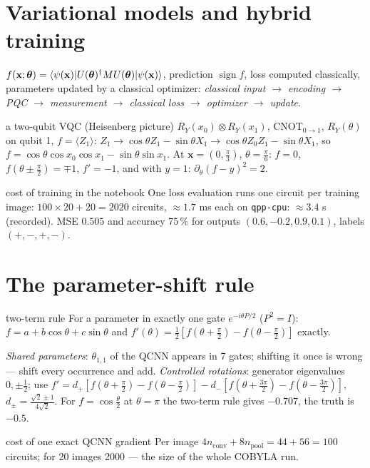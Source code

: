 \documentclass[11pt,a4paper,openany]{book}
\newcounter{wex}[chapter]
\newcommand{\bt}{\boldsymbol\theta}
\newcommand{\bx}{\mathbf x}
\begin{document}
\section{Variational models and hybrid training}
$f(\bx;\bt) = \braket{\psi(\bx)|U(\bt)^\dagger MU(\bt)|\psi(\bx)}$, prediction $\operatorname{sign}f$, loss computed classically, parameters
updated by a classical optimizer: \emph{classical input $\to$ encoding $\to$ PQC $\to$ measurement $\to$ classical loss $\to$ optimizer $\to$ update}.
\begin{wexample}{a two-qubit VQC (Heisenberg picture)}
$R_Y(x_0)\otimes R_Y(x_1)$, CNOT$_{0\to1}$, $R_Y(\theta)$ on qubit 1, $f = \langle Z_1\rangle$:
$Z_1 \to \cos\theta Z_1 - \sin\theta X_1 \to \cos\theta Z_0Z_1 - \sin\theta X_1$, so $f = \cos\theta\cos x_0\cos x_1 - \sin\theta\sin x_1$.
At $\bx = (0, \frac\pi3)$, $\theta = \frac\pi6$: $f = 0$, $f(\theta\pm\frac\pi2) = \mp1$, $f' = -1$, and with $y = 1$: $\partial_\theta(f - y)^2 = 2$.
\end{wexample}
\begin{keyres}{cost of training in the notebook}
One loss evaluation runs one circuit per training image: $100\times20 + 20 = 2020$ circuits, $\approx1.7$ ms each on \texttt{qpp-cpu}:
$\approx3.4$ s (recorded). MSE $0.505$ and accuracy $75\,\%$ for outputs $(0.6, -0.2, 0.9, 0.1)$, labels $(+,-,+,-)$.
\end{keyres}

\section{The parameter-shift rule}
\begin{keyres}{two-term rule}
For a parameter in exactly one gate $e^{-i\theta P/2}$ ($P^2 = I$): $f = a + b\cos\theta + c\sin\theta$ and
$f'(\theta) = \frac12[f(\theta + \frac\pi2) - f(\theta - \frac\pi2)]$ exactly.
\end{keyres}
\begin{trap}
\emph{Shared parameters}: $\theta_{1,1}$ of the QCNN appears in 7 gates; shifting it once is wrong --- shift every occurrence and add.
\emph{Controlled rotations}: generator eigenvalues $0, \pm\frac12$; use
$f' = d_+[f(\theta + \frac\pi2) - f(\theta - \frac\pi2)] - d_-[f(\theta + \frac{3\pi}2) - f(\theta - \frac{3\pi}2)]$, $d_\pm = \frac{\sqrt2\pm1}{4\sqrt2}$.
For $f = \cos\frac\theta2$ at $\theta = \pi$ the two-term rule gives $-0.707$, the truth is $-0.5$.
\end{trap}
\begin{keyres}{cost of one exact QCNN gradient}
Per image $4n_{\text{conv}} + 8n_{\text{pool}} = 44 + 56 = 100$ circuits; for 20 images 2000 --- the size of the whole COBYLA run.
\end{keyres}
\end{document}
